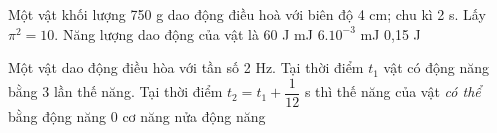 \begin{ex}%
Một vật khối lượng 750 g dao động điều hoà với biên độ 4 cm; chu kì 2 s. Lấy $\pi^2 = 10$. Năng lượng dao động của vật là
\choice
{60 J}
{ mJ}
{$6.10^{-3}$ mJ}
{0,15 J}
\end{ex} 
\begin{ex}%
Một vật dao động điều hòa với tần số 2 Hz. Tại thời điểm $t_1$ vật có động năng bằng 3 lần thế năng. Tại thời điểm $t_2=t_1+\dfrac{1}{12}$ s thì thế năng của vật \textit{có thể} bằng
\choice
{động năng}
{0}
{\True cơ năng}
{nửa động năng}
\end{ex} 
